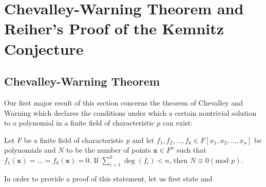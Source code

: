 \chapter{Chevalley-Warning Theorem and Reiher's Proof of the Kemnitz Conjecture}
\section{Chevalley-Warning Theorem}
Our first major result of this section concerns the theorem of Chevalley and Warning
which declares the conditions under which a certain nontrivial solution to a
polynomial in a finite field of characteristic $p$ can exist:
\begin{theorem} Let $F$ be a finite field of
	characteristic $p$ and let $f_1, f_2, \ldots, f_k \in F[x_1, x_2,
	\ldots, x_{n}]$ be polynomials and $N$ to be the number of points
	$\textbf{x}\in F^{n}$ such that $f_1\left( \textbf{x} \right) = \ldots
	= f_k \left( \textbf{x} \right)  = 0$. If $ \sum_{i= 1}^{k} \deg \left(
	f_{i} \right)< n$, then $N \equiv 0 (\text{mod } p) $.  \end{theorem}
	In order to provide a proof of this statement, let us first state and
